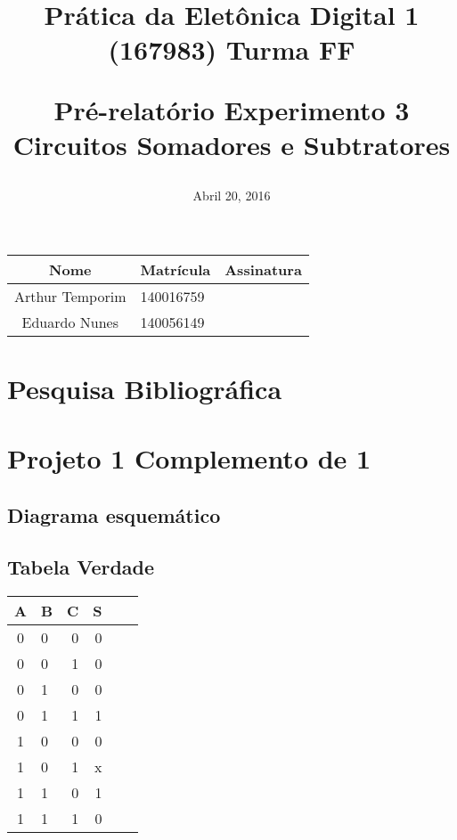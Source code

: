 \documentclass[12pts]{article}
\title{
	Prática da Eletônica Digital 1 (167983)
	\singlespace
	Turma FF
	\singlespacing
	\begin{midpage}
	\begin {large}
		Pré-relatório Experimento 3
		\singlespace
		Circuitos Somadores e Subtratores
	\end {large}
	\end{midpage}
}
\date{Abril 20, 2016}
\begin{document}
\maketitle	
\begin{center}

\begin{tabular}{|c|l|r|}
\hline
Nome & Matrícula & Assinatura\\
\hline
Arthur Temporim & 140016759 & \\
\hline	
Eduardo Nunes& 140056149 & \\
\hline	
\end{tabular}

\end{center}



\pagebreak
\section{Pesquisa Bibliográfica}

\section{Projeto 1 Complemento de 1}

\subsection{Diagrama esquemático}

\iffalse
\begin{figure}[!htb]
  \centering
  \texttt{[image: simulacao1]}
  \caption{Simulação 1. Circuito simulado em protheus 8.1 pro.}
  \label{figRotulo}
\end{figure}
\fi

\subsection{Tabela Verdade}

\begin{center}
	\begin{tabular}{|c|l|r|r|r|r|}
	\hline
	A & B & C & S\\
	\hline
	0 & 0 & 0 & 0\\
	\hline
	0 & 0 & 1 & 0\\
	\hline
	0 & 1 & 0 & 0\\
	\hline
	0 & 1 & 1 & 1\\
	\hline
	1 & 0 & 0 & 0\\
	\hline
	1 & 0 & 1 & x\\
	\hline
	1 & 1 & 0 & 1\\
	\hline
	1 & 1 & 1 & 0\\
	\hline
	\end{tabular}
\end{center}
\end{document}
